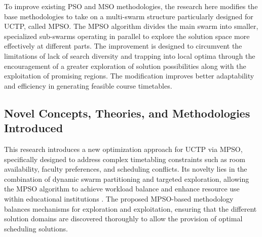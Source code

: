 To improve existing PSO and MSO methodologies, the research here modifies the base methodologies to take on a multi-swarm structure particularly designed for UCTP, called MPSO. The MPSO algorithm divides the main swarm into smaller, specialized sub-swarms operating in parallel to explore the solution space more effectively at different parts. \cite{XIA2018126} \cite{MultiSwarm2004} \cite{Blackwell2006-ms} The improvement is designed to circumvent the limitations of lack of search diversity and trapping into local optima through the encouragement of a greater exploration of solution possibilities along with the exploitation of promising regions. The modification improves better adaptability and efficiency in generating feasible course timetables.

\subsection{Novel Concepts, Theories, and Methodologies Introduced}

This research introduces a new optimization approach for UCTP via MPSO, specifically designed to address complex timetabling constraints such as room availability, faculty preferences, and scheduling conflicts. Its novelty lies in the combination of dynamic swarm partitioning and targeted exploration, allowing the MPSO algorithm to achieve workload balance and enhance resource use within educational institutions \cite{Bacanin2022-multiswarm}. The proposed MPSO-based methodology balances mechanisms for exploration and exploitation, ensuring that the different solution domains are discovered thoroughly to allow the provision of optimal scheduling solutions.